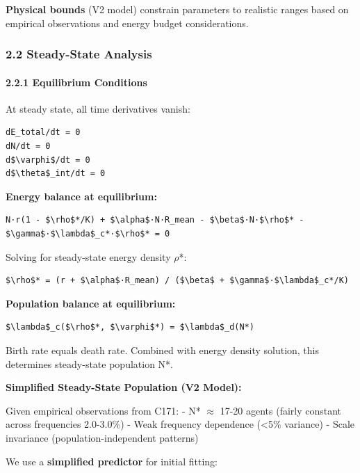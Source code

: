 \documentclass[
]{article}
\begin{document}
\textbf{Physical bounds} (V2 model) constrain parameters to realistic
ranges based on empirical observations and energy budget considerations.

\subsubsection{2.2 Steady-State Analysis}\label{steady-state-analysis}

\paragraph{2.2.1 Equilibrium Conditions}\label{equilibrium-conditions}

At steady state, all time derivatives vanish:

\begin{verbatim}
dE_total/dt = 0
dN/dt = 0
d$\varphi$/dt = 0
d$\theta$_int/dt = 0
\end{verbatim}

\textbf{Energy balance at equilibrium:}

\begin{verbatim}
N·r(1 - $\rho$*/K) + $\alpha$·N·R_mean - $\beta$·N·$\rho$* - $\gamma$·$\lambda$_c*·$\rho$* = 0
\end{verbatim}

Solving for steady-state energy density $\rho$*:

\begin{verbatim}
$\rho$* = (r + $\alpha$·R_mean) / ($\beta$ + $\gamma$·$\lambda$_c*/K)
\end{verbatim}

\textbf{Population balance at equilibrium:}

\begin{verbatim}
$\lambda$_c($\rho$*, $\varphi$*) = $\lambda$_d(N*)
\end{verbatim}

Birth rate equals death rate. Combined with energy density solution,
this determines steady-state population N*.

\textbf{Simplified Steady-State Population (V2 Model):}

Given empirical observations from C171: - N* $\approx$ 17-20 agents (fairly
constant across frequencies 2.0-3.0\%) - Weak frequency dependence
(\textless5\% variance) - Scale invariance (population-independent
patterns)

We use a \textbf{simplified predictor} for initial fitting:
\end{document}
